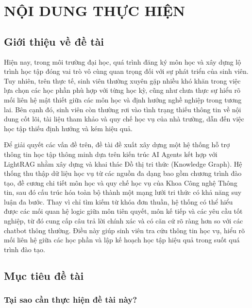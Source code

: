 \documentclass{article}[13pt]
\begin{document}
    \pagebreak

    \section{NỘI DUNG THỰC HIỆN}
    {

    \subsection{Giới thiệu về đề tài}

    Hiện nay, trong môi trường đại học, quá trình đăng ký môn học và xây dựng lộ trình học tập đóng vai trò vô cùng quan trọng đối với sự phát triển của sinh viên. Tuy nhiên, trên thực tế, sinh viên thường xuyên gặp nhiều khó khăn trong việc lựa chọn các học phần phù hợp với từng học kỳ, cũng như chưa thực sự hiểu rõ mối liên hệ mật thiết giữa các môn học và định hướng nghề nghiệp trong tương lai. Bên cạnh đó, sinh viên còn thường rơi vào tình trạng thiếu thông tin về nội dung cốt lõi, tài liệu tham khảo và quy chế học vụ của nhà trường, dẫn đến việc học tập thiếu định hướng và kém hiệu quả.

    Để giải quyết các vấn đề trên, đề tài đề xuất xây dựng một hệ thống hỗ trợ thông tin học tập thông minh dựa trên kiến trúc AI Agents kết hợp với LightRAG nhằm xây dựng và khai thác Đồ thị tri thức (Knowledge Graph). Hệ thống thu thập dữ liệu học vụ từ các nguồn đa dạng bao gồm chương trình đào tạo, đề cương chi tiết môn học và quy chế học vụ của Khoa Công nghệ Thông tin, sau đó cấu trúc hóa toàn bộ thành một mạng lưới tri thức có khả năng suy luận đa bước. Thay vì chỉ tìm kiếm từ khóa đơn thuần, hệ thống có thể hiểu được các mối quan hệ logic giữa môn tiên quyết, môn kế tiếp và các yêu cầu tốt nghiệp, từ đó cung cấp câu trả lời chính xác và có căn cứ rõ ràng hơn so với các chatbot thông thường. Điều này giúp sinh viên tra cứu thông tin học vụ, hiểu rõ mối liên hệ giữa các học phần và lập kế hoạch học tập hiệu quả trong suốt quá trình đào tạo.

    \subsection{Mục tiêu đề tài}

    \subsubsection{Tại sao cần thực hiện đề tài này?}

}
\end{document}
